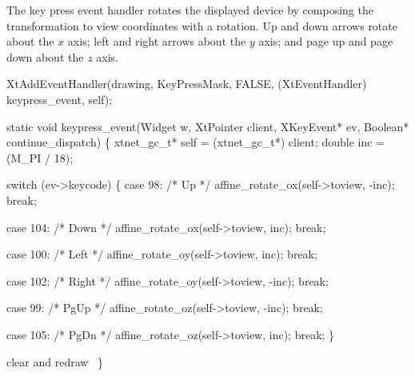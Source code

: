 The key press event handler rotates the displayed device by
composing the transformation to view coordinates with a
rotation.  Up and down arrows rotate about the $x$ axis;
left and right arrows about the $y$ axis; and page up and
page down about the $z$ axis.

\nwenddocs{}\plusendmoddef
XtAddEventHandler(drawing, KeyPressMask, FALSE,
                  (XtEventHandler) keypress_event, self);
\nwendcode{}\nwdocspar

\nwenddocs{}\plusendmoddef
static void keypress_event(Widget w, XtPointer client, XKeyEvent* ev,
                           Boolean* continue_dispatch)
\{
    xtnet_gc_t* self = (xtnet_gc_t*) client;
    double inc = (M_PI / 18);

    switch (ev->keycode) \{
        case 98:    /* Up    */
            affine_rotate_ox(self->toview, -inc);
            break;

        case 104:   /* Down  */
            affine_rotate_ox(self->toview, inc);
            break;
            
        case 100:   /* Left  */
            affine_rotate_oy(self->toview, inc);
            break;
            
        case 102:   /* Right */
            affine_rotate_oy(self->toview, -inc);
            break;

        case 99:    /* PgUp  */
            affine_rotate_oz(self->toview, -inc);
            break;

        case 105:   /* PgDn  */
            affine_rotate_oz(self->toview, inc);
            break;
    \}

    \LA{}clear and redraw~{\nwtagstyle{}}\RA{}
\}
\nwendcode{}

